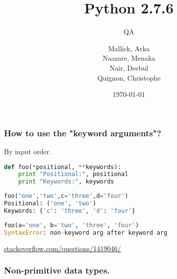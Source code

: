\documentclass{beamer}
\begin{document}
\title{Python 2.7.6}
\subtitle{QA}
\author{
  Mallick, Arka\\
  Naazare, Menaka \\
  Nair, Deebul\\
  Quignon, Christophe \\
} 
\date{\today}

\begin{frame}
\titlepage
\end{frame}


\begin{frame}[fragile]
\frametitle{How to use the "keyword arguments"?}
By input order.
\begin{lstlisting}[language=Python]
def foo(*positional, **keywords):
    print "Positional:", positional
    print "Keywords:", keywords
\end{lstlisting}

\begin{lstlisting}[language=Python]
foo('one','two',c='three',d='four')
Positional: ('one', 'two')
Keywords: {'c': 'three', 'd': 'four'}
\end{lstlisting}
\begin{lstlisting}[language=Python]
 foo(a='one', b='two', 'three', 'four')
SyntaxError: non-keyword arg after keyword arg
\end{lstlisting}
\hbox{}
\hbox{}
\scriptsize
\hfill{}\href{http://stackoverflow.com/questions/1419046/}{stackoverflow.com/questions/1419046/}

\end{frame}


\begin{frame}[fragile]
\frametitle{Non-primitive data types.}

\end{frame}







	
\end{document}
